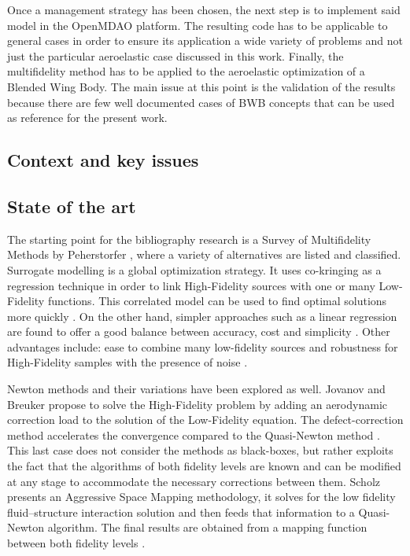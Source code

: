 Once a management strategy has been chosen, the next step is to implement said model in the OpenMDAO platform. The resulting code has to be applicable to general cases in order to ensure its application a wide variety of problems and not just the particular aeroelastic case discussed in this work. Finally, the multifidelity method has to be applied to the aeroelastic optimization of a Blended Wing Body. The main issue at this point is the validation of the results because there are few well documented cases of BWB concepts that can be used as reference for the present work. 
\subsection{Context and key issues}
\subsection{State of the art}
The starting point for the bibliography research is a Survey of Multifidelity Methods by Peherstorfer \cite{peherstorfer2018survey}, where a variety of alternatives are listed and classified. Surrogate modelling is a global optimization strategy. It uses co-kringing as a regression technique in order to link High-Fidelity sources with one or many Low-Fidelity functions. This
correlated model can be used to find optimal solutions more quickly \cite{Forrester2007}. On the other hand, simpler approaches such as a linear regression are found to offer a good balance between accuracy, cost and simplicity \cite{Zhang2019}. Other advantages include: ease to combine many low-fidelity sources and robustness for High-Fidelity samples with the presence of noise \cite{Zhang2019}. 

Newton methods and their variations have been explored as well. Jovanov and Breuker propose to solve the High-Fidelity problem by adding an aerodynamic correction load to the solution of the Low-Fidelity equation. The defect-correction method accelerates the convergence compared to the Quasi-Newton method \cite{Jovanov2015}. This last case does not consider the methods as black-boxes, but rather exploits the fact that the algorithms of both fidelity levels are known and can be modified at any stage to accommodate the necessary corrections between them. Scholz presents an Aggressive Space Mapping methodology, it solves for the low fidelity fluid–structure interaction solution and then feeds that information to a Quasi-Newton algorithm. The final results are obtained from a mapping function between both fidelity levels \cite{Scholcz2014}. 

